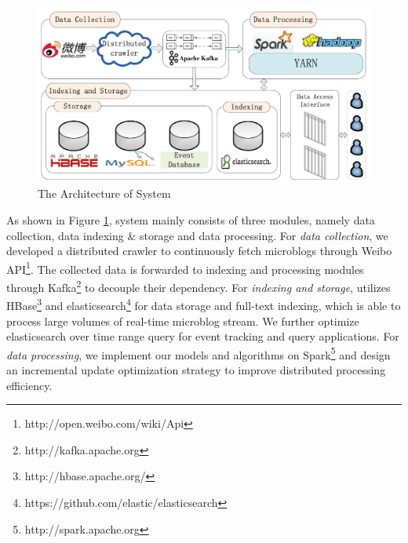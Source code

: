 

\begin{figure}[!t]
\centering
\includegraphics[scale=0.47]{system_architecture.pdf}
\centering
\caption{The Architecture of \ring System}
\label{fig:system_architecture}
\end{figure}

As shown in Figure \ref{fig:system_architecture},
\ring system mainly consists of three modules, namely data collection, data indexing \& storage and data processing.
For \emph{data collection}, we developed a distributed crawler to continuously fetch microblogs through Weibo API\footnote{http://open.weibo.com/wiki/Api}.
The collected data is forwarded to indexing and processing modules through Kafka\footnote{http://kafka.apache.org} to decouple their dependency.
For \emph{indexing and storage}, \ring utilizes HBase\footnote{http://hbase.apache.org/} and elasticsearch\footnote{https://github.com/elastic/elasticsearch} for data storage and full-text indexing, which is able to process large volumes of real-time microblog stream.
We further optimize elasticsearch over time range query for event tracking and query applications.
For \emph{data processing}, we implement our models and algorithms on Spark\footnote{http://spark.apache.org} and
 design an incremental update optimization strategy to improve distributed processing efficiency.
